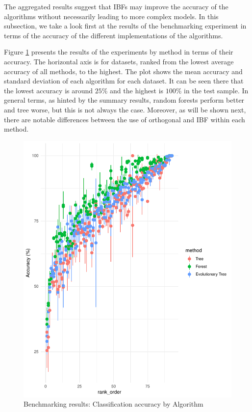 \documentclass[]{elsarticle} %
\makeatletter
\def\maxwidth{\ifdim\Gin@nat@width>\linewidth\linewidth
\else\Gin@nat@width\fi}
\let\Oldincludegraphics\includegraphics
\renewcommand{\includegraphics}[1]{\Oldincludegraphics[width=\maxwidth]{#1}}
\makeatother
\begin{document}
The aggregated results suggest that IBFs may improve the accuracy of the
algorithms without necessarily leading to more complex models. In this
subsection, we take a look first at the results of the benchmarking
experiment in terms of the accuracy of the different implementations of
the algorithms.

Figure \ref{fig:fig8-performance-algorithm-results} presents the results
of the experiments by method in terms of their accuracy. The horizontal
axis is for datasets, ranked from the lowest average accuracy of all
methods, to the highest. The plot shows the mean accuracy and standard
deviation of each algorithm for each dataset. It can be seen there that
the lowest accuracy is around \(25\)\% and the highest is \(100\)\% in
the test sample. In general terms, as hinted by the summary results,
random forests perform better and tree worse, but this is not always the
case. Moreover, as will be shown next, there are notable differences
between the use of orthogonal and IBF within each method.

\begin{figure}[htbp]
\centering
\includegraphics{Trees_with_Base_Functions_v2_files/figure-latex/fig8-performance-algorithm-results-1.pdf}
\caption{\label{fig:fig8-performance-algorithm-results}Benchmarking
results: Classification accuracy by Algorithm}
\end{figure}
\end{document}
